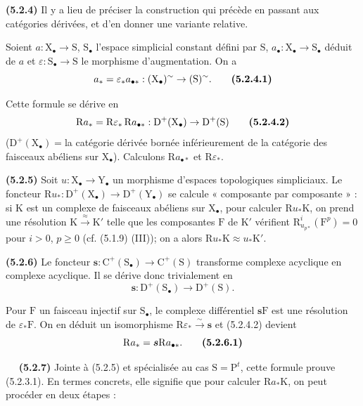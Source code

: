 \documentclass[11pt,leqno]{article}
\newcommand{\Page}[1]{\ifvmode\noindent\else\unskip\ \fi{\footnotesize\textcolor{gray}{[p.\,#1]}}\ \ignorespaces}
\begin{document}
\textbf{(5.2.4)} Il y a lieu de préciser la construction qui précède en passant aux catégories dérivées, et d’en donner une variante relative.

Soient \(a:\mathrm{X}_{\bullet}\to\mathrm{S}\), \(\mathrm{S}_{\bullet}\) l’espace simplicial constant défini par \(\mathrm{S}\), \(a_{\bullet}:\mathrm{X}_{\bullet}\to\mathrm{S}_{\bullet}\) déduit de \(a\) et \(\varepsilon:\mathrm{S}_{\bullet}\to\mathrm{S}\) le morphisme d’augmentation. On a
\[
a_*=\varepsilon_*a_{\bullet *}:
(\mathrm{X}_{\bullet})^{\sim}\to(\mathrm{S})^{\sim}.
\tag*{\textbf{(5.2.4.1)}}
\]

Cette formule se dérive en
\[
\mathrm{R}a_*=\mathrm{R}\varepsilon_*\,\mathrm{R}a_{\bullet *}:
\mathrm{D}^{+}(\mathrm{X}_{\bullet})\to\mathrm{D}^{+}(\mathrm{S})
\tag*{\textbf{(5.2.4.2)}}
\]
(\(\mathrm{D}^{+}(\mathrm{X}_{\bullet})=\)la catégorie dérivée bornée inférieurement de la catégorie des faisceaux abéliens sur \(\mathrm{X}_{\bullet}\)). Calculons \(\mathrm{R}a_{\bullet *}\) et \(\mathrm{R}\varepsilon_*\).

\textbf{(5.2.5)} Soit \(u:\mathrm{X}_{\bullet}\to\mathrm{Y}_{\bullet}\) un morphisme d’espaces topologiques simpliciaux. Le foncteur \(\mathrm{R}u_*:\mathrm{D}^{+}(\mathrm{X}_{\bullet})\to\mathrm{D}^{+}(\mathrm{Y}_{\bullet})\) se calcule « composante par composante » : si \(\mathrm{K}\) est un complexe de faisceaux abéliens sur \(\mathrm{X}_{\bullet}\), pour calculer \(\mathrm{R}u_*\mathrm{K}\), on prend une résolution \(\mathrm{K}\xrightarrow{\approx}\mathrm{K}'\) telle que les composantes \(\mathrm{F}\) de \(\mathrm{K}'\) vérifient \(\mathrm{R}^{i}_{u_{p*}}(\mathrm{F}^{p})=0\) pour \(i>0\), \(p\geq 0\) (cf. (5.1.9) (III)); on a alors \(\mathrm{R}u_*\mathrm{K}\approx u_*\mathrm{K}'\).

\textbf{(5.2.6)} Le foncteur \(\boldsymbol{s}:\mathrm{C}^{+}(\mathrm{S}_{\bullet})\to\mathrm{C}^{+}(\mathrm{S})\) transforme complexe acyclique en complexe acyclique. Il se dérive donc trivialement en
\[
\boldsymbol{s}:\mathrm{D}^{+}(\mathrm{S}_{\bullet})\to\mathrm{D}^{+}(\mathrm{S}).
\]

Pour \(\mathrm{F}\) un faisceau injectif sur \(\mathrm{S}_{\bullet}\), le complexe différentiel \(\boldsymbol{s}\mathrm{F}\) est une résolution de \(\varepsilon_*\mathrm{F}\). On en déduit un isomorphisme \(\mathrm{R}\varepsilon_*\xrightarrow{\sim}\boldsymbol{s}\) et (5.2.4.2) devient
\[
\mathrm{R}a_*=\boldsymbol{s}\mathrm{R}a_{\bullet *}.
\tag*{\textbf{(5.2.6.1)}}
\]

\Page{14}
\textbf{(5.2.7)} Jointe à (5.2.5) et spécialisée au cas \(\mathrm{S}=\mathrm{P}^{t}\), cette formule prouve (5.2.3.1). En termes concrets, elle signifie que pour calculer \(\mathrm{R}a_*\mathrm{K}\), on peut procéder en deux étapes :
\end{document}
